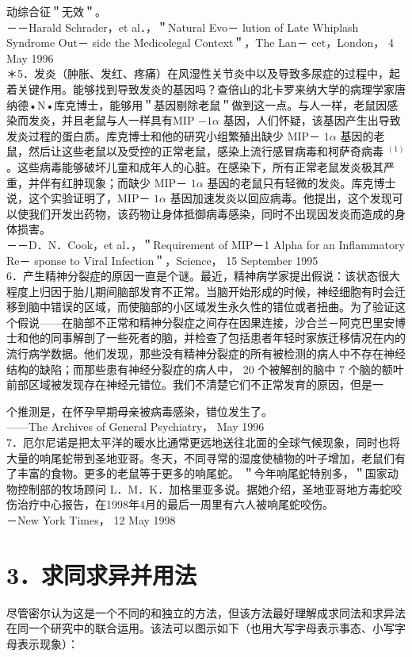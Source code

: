 动综合征＂无效＂。\\
－－Harald Schrader，et al．，＂Natural Evo－ lution of Late Whiplash Syndrome Out－ side the Medicolegal Context＂，The Lan－ cet，London， 4 May 1996\\
＊5．发炎（肿胀、发红、疼痛）在风湿性关节炎中以及导致多尿症的过程中，起着关键作用。能够找到导致发炎的基因吗？查倍山的北卡罗来纳大学的病理学家唐纳德•N•库克博士，能够用＂基因剔除老鼠＂做到这一点。与人一样，老鼠因感染而发炎，并且老鼠与人一样具有MIP $-1 \alpha$ 基因，人们怀疑，该基因产生出导致发炎过程的蛋白质。库克博士和他的研究小组繁殖出缺少 MIP－ $1 \alpha$ 基因的老鼠，然后让这些老鼠以及受控的正常老鼠，感染上流行感冒病毒和柯萨奇病毒 ${ }^{(1)}$ 。这些病毒能够破坏儿童和成年人的心脏。在感染下，所有正常老鼠发炎极其严重，并伴有红肿现象；而缺少 MIP－ $1 \alpha$ 基因的老鼠只有轻微的发炎。库克博士说，这个实验证明了，MIP－ $1 \alpha$ 基因加速发炎以回应病毒。他提出，这个发现可以使我们开发出药物，该药物让身体抵御病毒感染，同时不出现因发炎而造成的身体损害。\\
－－D．N．Cook，et al．，＂Requirement of MIP－1 Alpha for an Inflammatory Re－ sponse to Viral Infection＂，Science， 15 September 1995\\
6．产生精神分裂症的原因一直是个谜。最近，精神病学家提出假说：该状态很大程度上归因于胎儿期间脑部发育不正常。当脑开始形成的时候，神经细胞有时会迁移到脑中错误的区域，而使脑部的小区域发生永久性的错位或者扭曲。为了验证这个假说——在脑部不正常和精神分裂症之间存在因果连接，沙合兰－阿克巴里安博士和他的同事解剖了一些死者的脑，并检查了包括患者年轻时家族迁移情况在内的流行病学数据。他们发现，那些没有精神分裂症的所有被检测的病人中不存在神经结构的缺陷；而那些患有神经分裂症的病人中， 20 个被解剖的脑中 7 个脑的额叶前部区域被发现存在神经元错位。我们不清楚它们不正常发育的原因，但是一

个推测是，在怀孕早期母亲被病毒感染，错位发生了。\\
——The Archives of General Psychiatry， May 1996\\
7．厄尔尼诺是把太平洋的暖水比通常更远地送往北面的全球气候现象，同时也将大量的响尾蛇带到圣地亚哥。冬天，不同寻常的湿度使植物的叶子增加，老鼠们有了丰富的食物。更多的老鼠等于更多的响尾蛇。 ＂今年响尾蛇特别多，＂国家动物控制部的牧场顾问 L．M．K．加格里亚多说。据她介绍，圣地亚哥地方毒蛇咬伤治疗中心报告，在1998年4月的最后一周里有六人被响尾蛇咬伤。\\
－New York Times， 12 May 1998

\section*{3．求同求异并用法}
尽管密尔认为这是一个不同的和独立的方法，但该方法最好理解成求同法和求异法在同一个研究中的联合运用。该法可以图示如下（也用大写字母表示事态、小写字母表示现象）：

